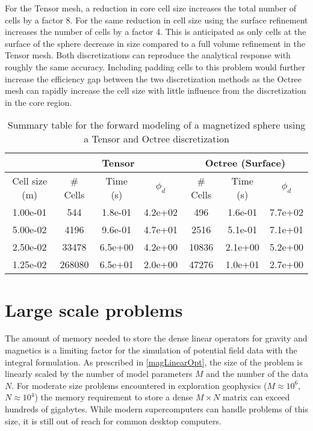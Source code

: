 For the Tensor mesh, a reduction in core cell size increases the total number of cells by a factor 8. For the same reduction in cell size using the surface refinement increases the number of cells by a factor 4. This is anticipated as only cells at the surface of the sphere decrease in size compared to a full volume refinement in the Tensor mesh. Both discretizations can reproduce the analytical response with roughly the same accuracy. Including padding cells to this problem would further increase the efficiency gap between the two discretization methods as the Octree mesh can rapidly increase the cell size with little influence from the discretization in the core region.
\begin{table}\centering
\begin{tabular}{|c|c|c|c||c|c|c|}\hline
& \multicolumn{3}{c}{Tensor} \vline \vline & \multicolumn{3}{c}{Octree (Surface)}\vline \\ \hline
Cell size (m) & \# Cells & Time (s) & $\phi_d$ & \# Cells & Time (s) & $\phi_d$ \\ \hline
1.00e-01 & 544 & 1.8e-01 & 4.2e+02 & 496 & 1.6e-01 & 7.7e+02 \\
5.00e-02 & 4196 & 9.6e-01 & 4.7e+01 & 2516 & 5.1e-01 & 7.1e+01 \\
2.50e-02 & 33478 & 6.5e+00 & 4.2e+00 & 10836 & 2.1e+00 & 5.2e+00 \\
1.25e-02 & 268080 & 6.5e+01 & 2.0e+00 & 47276 & 1.0e+01 & 2.7e+00 \\
\hline
\end{tabular}
\caption{Summary table for the forward modeling of a magnetized sphere using a Tensor and Octree discretization}
\label{AnalyticSphere}
\end{table}


\section{Large scale problems}\label{MeshDecoupling}
The amount of memory needed to store the dense linear operators for gravity and magnetics is a limiting factor for the simulation of potential field data with the integral formulation. As prescribed in \eqref{magLinearOpt}, the size of the problem is linearly scaled by the number of model parameters $M$ and the number of the data $N$. For moderate size problems encountered in exploration geophysics ($M\approx 10^6$, $N\approx10^4$) the memory requirement to store a dense $M\times N$ matrix can exceed hundreds of gigabytes. While modern supercomputers can handle problems of this size, it is still out of reach for common desktop computers.

